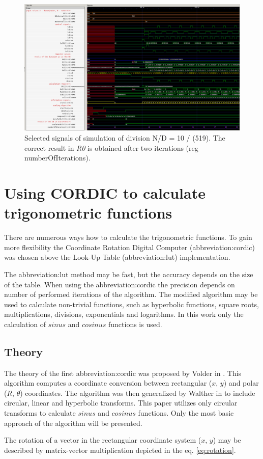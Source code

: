 \documentclass[a4paper, twoside, 11pt]{article}
\begin{document}
\begin{figure}[htbp!]
  \centering
  \includegraphics[width=1\textwidth]{src/png/division-10-div-519.png}
    \caption{Selected signals of simulation of division N/D = 10 / (519). The correct result in \textit{R0} is obtained after two iterations (reg numberOfIterations).}
  \label{fig:division-10-div-519}
\end{figure}

\section{Using CORDIC to calculate trigonometric functions}
    There are numerous ways how to calculate the trigonometric functions. To gain more flexibility the Coordinate Rotation Digital Computer (\gls{abbreviation:cordic}) was chosen above the Look-Up Table (\gls{abbreviation:lut}) implementation.\par
    The \gls{abbreviation:lut} method may be fast, but the accuracy depends on the size of the table. When using the \gls{abbreviation:cordic} the precision depends on number of performed iterations of the algorithm. The modified algorithm may be used to calculate non-trivial functions, such as hyperbolic functions, square roots, multiplications, divisions, exponentials and logarithms. \cite{base-digital-signal-processing-with-field-programmable-gate-arrays} In this work only the calculation of $sinus$ and $cosinus$ functions is used.
    \subsection{Theory}\label{subsec:cordic-theory}
        The theory of the first \gls{abbreviation:cordic} was proposed by Volder in \cite{volder-cordic-trigonomtric-computing-technique}. This algorithm computes a coordinate conversion between rectangular ($x$, $y$) and polar ($R$, $\theta$) coordinates. The algorithm was then generalized by Walther in \cite{walther-a-unified-algorithm-for-elementary-functions} to include circular, linear and hyperbolic transforms. This paper utilizes only circular transforms to calculate $sinus$ and $cosinus$ functions. Only the most basic approach of the algorithm will be presented.\par
        The rotation of a vector in the rectangular coordinate system ($x$, $y$) may be described by matrix-vector multiplication depicted in the eq. \ref{eq:rotation}.
\end{document}
